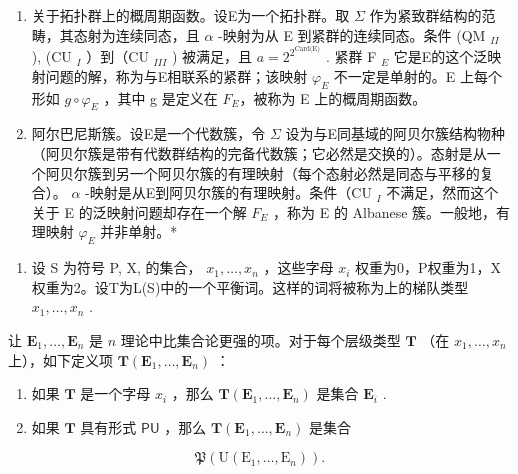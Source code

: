 \begin{enumerate}
\def\labelenumi{\Roman{enumi}.}
\setcounter{enumi}{7}
\item
  关于拓扑群上的概周期函数。设E为一个拓扑群。取 \(\Sigma\) 作为紧致群结构的范畴，其态射为连续同态，且 \(\alpha\) -映射为从 E 到紧群的连续同态。条件 (QM \(_{II}\) ), (CU \(_{I}\) ）到（CU \(_{III}\) ) 被满足，且 \(a = 2^{2^{\text{Card(E)}}}\) . 紧群 F \(_{E}\) 它是E的这个泛映射问题的解，称为与E相联系的紧群；该映射 \(\varphi_{E}\) 不一定是单射的。E 上每个形如 \(g \circ \varphi_{E}\) ，其中 g 是定义在 \(F_E\)，被称为 E 上的概周期函数。
\item
  阿尔巴尼斯簇。设E是一个代数簇，令 \(\Sigma\) 设为与E同基域的阿贝尔簇结构物种（阿贝尔簇是带有代数群结构的完备代数簇；它必然是交换的）。态射是从一个阿贝尔簇到另一个阿贝尔簇的有理映射（每个态射必然是同态与平移的复合）。 \(\alpha\) -映射是从E到阿贝尔簇的有理映射。条件（CU \(_{I}\) 不满足，然而这个关于 E 的泛映射问题却存在一个解 \(F_{E}\) ，称为 E 的 Albanese 簇。一般地，有理映射 \(\varphi_{E}\) 并非单射。*
\end{enumerate}

\startexercises

\exercisegroup

\begin{enumerate}
\def\labelenumi{\arabic{enumi}.}
\tightlist
\item
  设 S 为符号 P, X, 的集合， \(x_{1}, \ldots, x_{n}\) ，这些字母 \(x_{i}\) 权重为0，P权重为1，X权重为2。设T为L(S)中的一个平衡词。这样的词将被称为上的梯队类型 \(x_{1}, \ldots, x_{n}\) .
\end{enumerate}

让 \(\mathbf{E}_1, \ldots, \mathbf{E}_n\) 是 \(n\) 理论中比集合论更强的项。对于每个层级类型 \(\mathbf{T}\) （在 \(x_1, \ldots, x_n\) 上），如下定义项 \(\mathbf{T}(\mathbf{E}_1, \ldots, \mathbf{E}_n)\) ：

\begin{enumerate}
\def\labelenumi{(\roman{enumi})}
\item
  如果 \(\mathbf{T}\) 是一个字母 \(x_{i}\) ，那么 \(\mathbf{T}(\mathbf{E}_{1},\ldots,\mathbf{E}_{n})\) 是集合 \(\mathbf{E}_i\) .
\item
  如果 \(\mathbf{T}\) 具有形式 \(\mathsf{PU}\) ，那么 \(\mathbf{T}(\mathbf{E}_1, \ldots, \mathbf{E}_n)\) 是集合
\end{enumerate}

\[
\mathfrak {P} (\mathrm{U} (\mathrm{E} _ {1}, \dots , \mathrm{E} _ {n})).
\]

